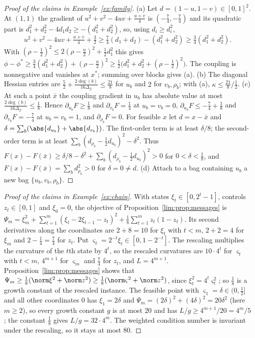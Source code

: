 \begin{proof}[Proof of the claims in Example~\ref{ex:family}]
(a) Let $d=(1-u,1-v)\in[0,1]^2$. At $(1,1)$ the gradient of
$u^2+v^2-4uv+\frac{u+v}4$ is $(-\frac74,-\frac74)$ and its quadratic part is
$d_1^2+d_2^2-4d_1d_2\ge-(d_1^2+d_2^2)$, so, using $d_i\ge d_i^2$,
\[
u^2+v^2-4uv+\tfrac{u+v}4+\tfrac32\ge\tfrac74(d_1+d_2)-(d_1^2+d_2^2)
\ge\tfrac34(d_1^2+d_2^2).
\]
With $(\rho-\frac12)^2\le2(\rho-\frac u2)^2+\frac12d_1^2$ this gives
$\phi-\phi^*\ge\frac34(d_1^2+d_2^2)+(\rho-\frac u2)^2\ge\frac12\bigl(d_1^2+d_2^2
+(\rho-\frac12)^2\bigr)$. The coupling is nonnegative and vanishes at $x^*$;
summing over blocks gives (a). (b) The diagonal Hessian entries are
$\frac52+\frac{2\deg(b)}{16\Delta_{\mathcal G}}\le\frac{21}8$ for $u_b$ and
$2$ for $v_b,\rho_b$; with (a), $\kappa\le\frac{21}8/\frac12$.
(c) At such a point $\bar x$ the coupling gradient in $u_b$ has absolute
value at most $\frac{2\deg(b)}{16\Delta_{\mathcal G}}\le\frac18$. Hence
$\partial_{u_b}F\ge\frac18$ and $\partial_{v_b}F=\frac14$ at $u_b=v_b=0$,
$\partial_{u_b}F\le-\frac74+\frac18$ and $\partial_{v_b}F=-\frac74$ at
$u_b=v_b=1$, and $\partial_{\rho_b}F=0$. For feasible $x$ let $d=x-\bar x$
and $\delta=\sum_b(\abs{d_{u_b}}+\abs{d_{v_b}})$. The first-order term is at
least $\delta/8$; the second-order term is at least
$\sum_b(d_{\rho_b}-\frac12d_{u_b})^2-\delta^2$. Thus
$F(x)-F(\bar x)\ge\delta/8-\delta^2+\sum_b(d_{\rho_b}-\frac12d_{u_b})^2>0$ for
$0<\delta<\frac18$, and $F(x)-F(\bar x)=\sum_bd_{\rho_b}^2>0$ for $\delta=0\ne d$.
(d) Attach to a bag containing $u_b$ a new bag $\{u_b,v_b,\rho_b\}$.
\end{proof}

\begin{proof}[Proof of the claims in Example~\ref{ex:chain}]
With states $\xi_t\in[0,2^t-1]$, controls $z_t\in[0,1]$ and $\xi_0=0$, the
objective of Proposition~\ref{lim:prop:messages} is
$\Psi_m=\xi_m^2+\sum_{t=1}^m(\xi_t-2\xi_{t-1}-z_t)^2
+\frac18\sum_{t=1}^mz_t(1-z_t)$.
Its second derivatives along the coordinates are $2+8=10$ for $\xi_t$ with
$t<m$, $2+2=4$ for $\xi_m$ and $2-\frac14=\frac74$ for $z_t$. Put
$\varsigma_t=2^{-t}\xi_t\in[0,1-2^{-t}]$. The rescaling multiplies the
curvature of the $t$th state by $4^t$, so the rescaled curvatures are
$10\cdot4^t$ for $\varsigma_t$ with $t<m$, $4^{m+1}$ for $\varsigma_m$ and
$\frac74$ for $z_t$,
and $L=4^{m+1}$. Proposition~\ref{lim:prop:messages} shows that
$\Psi_m\ge\frac18(\norm\xi^2+\norm z^2)\ge\frac18(\norm\varsigma^2+\norm z^2)$,
since $\xi_t^2=4^t\varsigma_t^2$; so $\frac18$ is a growth constant of the
rescaled instance. The feasible point with $\varsigma_1=\delta\in(0,\frac12]$
and all other coordinates $0$ has $\xi_1=2\delta$ and
$\Psi_m=(2\delta)^2+(4\delta)^2=20\delta^2$ (here $m\ge2$), so every growth constant
$g$ is at most $20$ and has $L/g\ge4^{m+1}/20=4^m/5$; the constant $\frac18$
gives $L/g=32\cdot4^m$. The weighted condition number is invariant under the
rescaling, so it stays at most $80$.
\end{proof}
